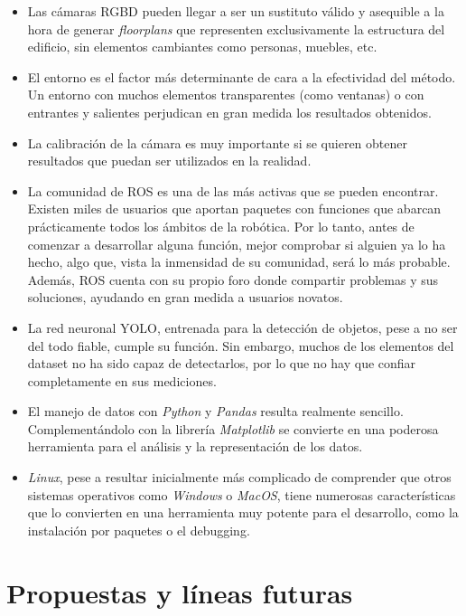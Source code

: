 \begin{itemize}

	\item Las cámaras RGBD pueden llegar a ser un sustituto válido y asequible a la hora de generar \textit{floorplans} que representen exclusivamente la estructura del edificio, sin elementos cambiantes como personas, muebles, etc.
	\item El entorno es el factor más determinante de cara a la efectividad del método. Un entorno con muchos elementos transparentes (como ventanas) o con entrantes y salientes perjudican en gran medida los resultados obtenidos.
	\item La calibración de la cámara es muy importante si se quieren obtener resultados que puedan ser utilizados en la realidad.
	\item La comunidad de ROS es una de las más activas que se pueden encontrar. Existen miles de usuarios que aportan paquetes con funciones que abarcan prácticamente todos los ámbitos de la robótica. Por lo tanto, antes de comenzar a desarrollar alguna función, mejor comprobar si alguien ya lo ha hecho, algo que, vista la inmensidad de su comunidad, será lo más probable. Además, ROS cuenta con su propio foro donde compartir problemas y sus soluciones, ayudando en gran medida a usuarios novatos.
	\item La red neuronal YOLO, entrenada para la detección de objetos, pese a no ser del todo fiable, cumple su función. Sin embargo, muchos de los elementos del dataset no ha sido capaz de detectarlos, por lo que no hay que confiar completamente en sus mediciones.
	\item El manejo de datos con \textit{Python} y \textit{Pandas}
 resulta realmente sencillo. Complementándolo con la librería \textit{Matplotlib} se convierte en una poderosa herramienta para el análisis y la representación de los datos.
 	\item \textit{Linux}, pese a resultar inicialmente más complicado de comprender que otros sistemas operativos como \textit{Windows} o \textit{MacOS}, tiene numerosas características que lo convierten en una herramienta muy potente para el desarrollo, como la instalación por paquetes o el debugging.

\end{itemize}

\section{Propuestas y líneas futuras}

